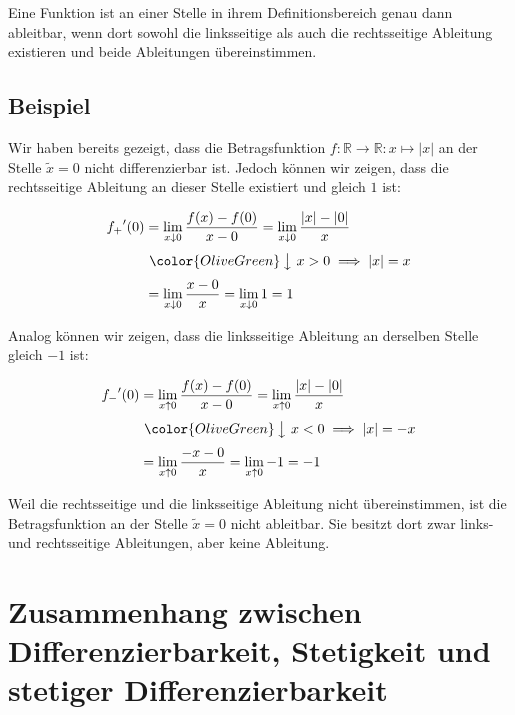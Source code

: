 \documentclass[fontsize=9pt,
               parskip=half-,
               DIV=14,
               listof=chapterentry,
               tocflat]{scrbook}
\begin{document}
\begin{importantparagraph*}
Eine Funktion ist an einer Stelle in ihrem Definitionsbereich genau dann ableitbar, wenn dort sowohl die linksseitige als auch die rechtsseitige Ableitung existieren und beide Ableitungen übereinstimmen.

\end{importantparagraph*}

\subsection{Beispiel}

Wir haben bereits gezeigt, dass die Betragsfunktion $f:\mathbb {R} \to \mathbb {R} :x\mapsto |x|$ an der Stelle ${\tilde {x}}=0$ nicht differenzierbar ist. Jedoch können wir zeigen, dass die rechtsseitige Ableitung an dieser Stelle existiert und gleich $1$ ist:

\begin{align*}
{f_{+}}'(0)&=\lim _{x\downarrow 0}{\frac {f(x)-f(0)}{x-0}}=\lim _{x\downarrow 0}{\frac {|x|-|0|}{x}}\\[0.3em]&\ {\color {OliveGreen}\left\downarrow \ x>0\implies |x|=x\right.}\\[0.3em]&=\lim _{x\downarrow 0}{\frac {x-0}{x}}=\lim _{x\downarrow 0}1=1
\end{align*}

Analog können wir zeigen, dass die linksseitige Ableitung an derselben Stelle gleich $-1$ ist:

\begin{align*}
{f_{-}}'(0)&=\lim _{x\uparrow 0}{\frac {f(x)-f(0)}{x-0}}=\lim _{x\uparrow 0}{\frac {|x|-|0|}{x}}\\[0.3em]&\ {\color {OliveGreen}\left\downarrow \ x<0\implies |x|=-x\right.}\\[0.3em]&=\lim _{x\uparrow 0}{\frac {-x-0}{x}}=\lim _{x\uparrow 0}-1=-1
\end{align*}

Weil die rechtsseitige und die linksseitige Ableitung nicht übereinstimmen, ist die Betragsfunktion an der Stelle ${\tilde {x}}=0$ nicht ableitbar. Sie besitzt dort zwar links- und rechtsseitige Ableitungen, aber keine Ableitung.

\section{Zusammenhang zwischen Differenzierbarkeit, Stetigkeit und stetiger Differenzierbarkeit}
\end{document}
